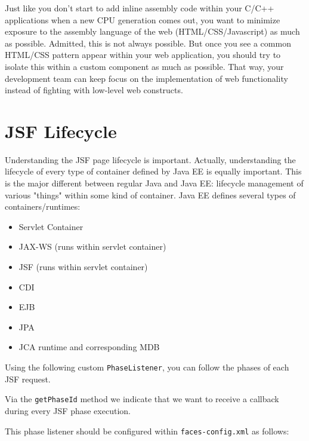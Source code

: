 Just like you don't start to add inline assembly code within your C/C++ applications when a new CPU generation comes out,
you want to minimize exposure to the assembly language of the web (HTML/CSS/Javascript) as much as possible.
Admitted, this is not always possible.
But once you see a common HTML/CSS pattern appear within your web application,
you should try to isolate this within a custom component as much as possible.
That way, your development team can keep focus on the implementation of web functionality instead of fighting with low-level web constructs.

\section{JSF Lifecycle}
Understanding the JSF page lifecycle is important.
Actually, understanding the lifecycle of every type of container defined by Java EE is equally important.
This is the major different between regular Java and Java EE: lifecycle management of various "things" within some kind of container.
Java EE defines several types of containers/runtimes:
\begin{itemize}
	\item Servlet Container
	\item JAX-WS (runs within servlet container)
	\item JSF (runs within servlet container)
	\item CDI
	\item EJB
	\item JPA
	\item JCA runtime and corresponding MDB
\end{itemize}

Using the following custom \texttt{PhaseListener}, you can follow the phases of each JSF request.

Via the \texttt{getPhaseId} method we indicate that we want to receive a callback during every JSF phase execution.

This phase listener should be configured within \texttt{faces-config.xml} as follows:


